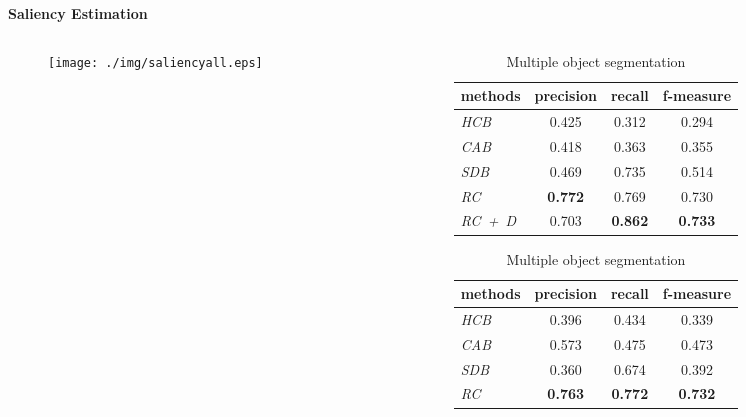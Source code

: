 \begin{frame}{\textbf{Saliency Estimation}}
\begin{columns}
	\begin{column}{0.48\textwidth}
		\begin{figure}
		\centering
		\texttt{[image: ./img/saliencyall.eps]}
	\end{figure}
	\end{column}
	\begin{column}{0.48\textwidth}
	\begin{scriptsize}
		\begin{table}[htbp]
		\caption{Results on Weizmann Dataset}
			\begin{subtable}{\textwidth}
			\centering
			\caption{Single object segmentation}
			\begin{tabular}{|l|c|c|c|} \hline
			\textbf{methods} & \textbf{precision} & \textbf{recall} & \textbf{f-measure} \\ \hline
 	    			\emph{HCB} & 0.425 & 0.312 & 0.294 \\
	 			\emph{CAB} & 0.418 & 0.363 & 0.355 \\
 	 			\emph{SDB} & 0.469 & 0.735 & 0.514 \\
	 			\emph{RC}  & {\color{yellow}\textbf{0.772}} & 0.769 & 0.730 \\
	 			\emph{RC~+~D} & 0.703	& {\color{yellow}\textbf{0.862}} & {\color{yellow}\textbf{0.733}}	\\ \hline
   			\end{tabular}
  	 	\end{subtable}
		\hspace{2em}
		\begin{subtable}{\textwidth}
			\centering
			\caption{Multiple object segmentation}			
			\begin{tabular}{|l|c|c|c|} \hline
				\textbf{methods} & \textbf{precision} & \textbf{recall} & \textbf{f-measure} \\ \hline
				\emph{HCB} & 0.396 & 0.434 & 0.339 \\
				\emph{CAB} & 0.573 & 0.475 & 0.473 \\
				\emph{SDB} & 0.360 & 0.674 & 0.392 \\
				\emph{RC}  & {\color{yellow}\textbf{0.763}} & {\color{yellow}\textbf{0.772}} & {\color{yellow}\textbf{0.732}} \\ \hline
   			\end{tabular}
	   	\end{subtable}
 		\end{table} 
	\end{scriptsize}
	\end{column}
\end{columns}
\end{frame}


